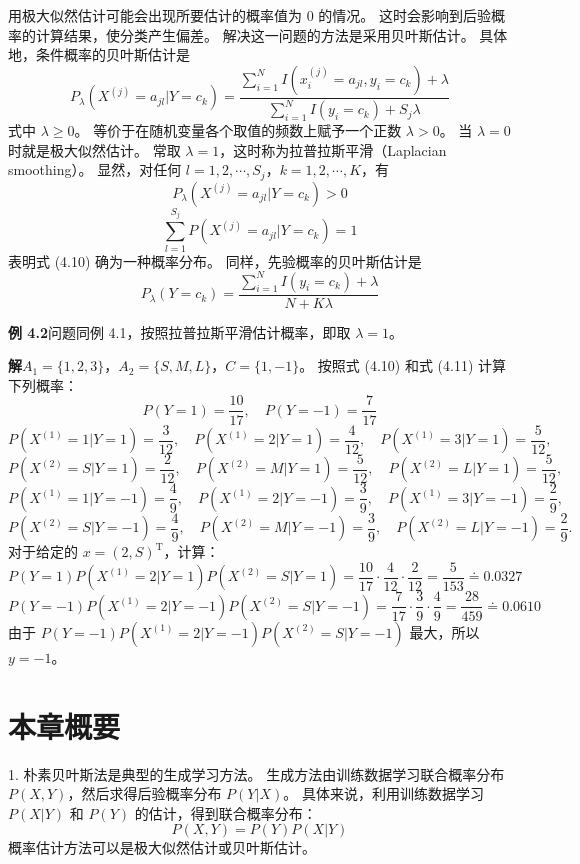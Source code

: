 \documentclass[UTF8, 12pt, fontset=fandol, oneside]{ctexart}
\begin{document}
用极大似然估计可能会出现所要估计的概率值为 $0$ 的情况。
这时会影响到后验概率的计算结果，使分类产生偏差。
解决这一问题的方法是采用贝叶斯估计。
具体地，条件概率的贝叶斯估计是
\begin{equation}
  P_\lambda(X^{(j)}=a_{jl}|Y=c_k)
  =
  \frac{\sum_{i=1}^N I(x_i^{(j)}=a_{jl},y_i=c_k)+\lambda}
       {\sum_{i=1}^N I(y_i=c_k)+S_j\lambda}
  \tag{4.10}
\end{equation}
式中 $\lambda\ge 0$。
等价于在随机变量各个取值的频数上赋予一个正数 $\lambda>0$。
当 $\lambda=0$ 时就是极大似然估计。
常取 $\lambda=1$，这时称为拉普拉斯平滑（Laplacian smoothing）。
显然，对任何 $l=1,2,\cdots,S_j$，$k=1,2,\cdots,K$，有
\[
  P_\lambda(X^{(j)}=a_{jl}|Y=c_k)>0
\]
\[
  \sum_{l=1}^{S_j}P(X^{(j)}=a_{jl}|Y=c_k)=1
\]
表明式 (4.10) 确为一种概率分布。
同样，先验概率的贝叶斯估计是
\begin{equation}
  P_\lambda(Y=c_k)=
  \frac{\sum_{i=1}^N I(y_i=c_k)+\lambda}
       {N+K\lambda}
  \tag{4.11}
\end{equation}

\noindent\textbf{例 4.2}\quad 问题同例 4.1，按照拉普拉斯平滑估计概率，即取 $\lambda=1$。

\noindent\textbf{解}\quad $A_1=\{1,2,3\}$，$A_2=\{S,M,L\}$，$C=\{1,-1\}$。
按照式 (4.10) 和式 (4.11) 计算下列概率：
\[
  P(Y=1)=\frac{10}{17},\quad P(Y=-1)=\frac{7}{17}
\]
\[
  P(X^{(1)}=1|Y=1)=\frac{3}{12},\quad
  P(X^{(1)}=2|Y=1)=\frac{4}{12},\quad
  P(X^{(1)}=3|Y=1)=\frac{5}{12},
\]
\[
  P(X^{(2)}=S|Y=1)=\frac{2}{12},\quad
  P(X^{(2)}=M|Y=1)=\frac{5}{12},\quad
  P(X^{(2)}=L|Y=1)=\frac{5}{12},
\]
\[
  P(X^{(1)}=1|Y=-1)=\frac{4}{9},\quad
  P(X^{(1)}=2|Y=-1)=\frac{3}{9},\quad
  P(X^{(1)}=3|Y=-1)=\frac{2}{9},
\]
\[
  P(X^{(2)}=S|Y=-1)=\frac{4}{9},\quad
  P(X^{(2)}=M|Y=-1)=\frac{3}{9},\quad
  P(X^{(2)}=L|Y=-1)=\frac{2}{9}.
\]
对于给定的 $x=(2,S)^{\mathrm{T}}$，计算：
\[
  P(Y=1)P(X^{(1)}=2|Y=1)P(X^{(2)}=S|Y=1)
  =\frac{10}{17}\cdot\frac{4}{12}\cdot\frac{2}{12}
  =\frac{5}{153}\doteq 0.0327
\]
\[
  P(Y=-1)P(X^{(1)}=2|Y=-1)P(X^{(2)}=S|Y=-1)
  =\frac{7}{17}\cdot\frac{3}{9}\cdot\frac{4}{9}
  =\frac{28}{459}\doteq 0.0610
\]
由于 $P(Y=-1)P(X^{(1)}=2|Y=-1)P(X^{(2)}=S|Y=-1)$ 最大，所以 $y=-1$。

\section*{本章概要}

1. 朴素贝叶斯法是典型的生成学习方法。
生成方法由训练数据学习联合概率分布 $P(X,Y)$，然后求得后验概率分布 $P(Y|X)$。
具体来说，利用训练数据学习 $P(X|Y)$ 和 $P(Y)$ 的估计，得到联合概率分布：
\[
  P(X,Y)=P(Y)P(X|Y)
\]
概率估计方法可以是极大似然估计或贝叶斯估计。
\end{document}
